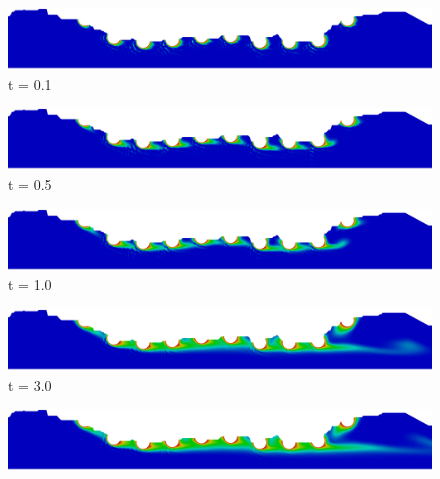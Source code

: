 \bigskip
\begin{figure}[H]
     \begin{minipage}{.50\linewidth}
      \centering
      \includegraphics[scale=0.115]{./02_chaps/cap_solution/figure/conc10_RealStrut500.png}\\
      t = 0.1
     \end{minipage}%
     \begin{minipage}{.50\linewidth}
      \centering
      \includegraphics[scale=0.115]{./02_chaps/cap_solution/figure/conc10_RealStrut2500.png}\\
      t = 0.5
     \end{minipage}
     \begin{minipage}{.50\linewidth}
     \medskip
      \centering
      \includegraphics[scale=0.115]{./02_chaps/cap_solution/figure/conc10_RealStrut5000.png}\\
      t = 1.0
     \end{minipage}%
     \begin{minipage}{.50\linewidth}
     \medskip
      \centering
      \includegraphics[scale=0.115]{./02_chaps/cap_solution/figure/conc10_RealStrut15000.png}\\
      t = 3.0
     \end{minipage}
     \begin{minipage}{.50\linewidth}
      \centering
      \includegraphics[scale=0.115]{./02_chaps/cap_solution/figure/conc10_RealStrut20000.png}\\

\end{minipage}
\end{figure}
